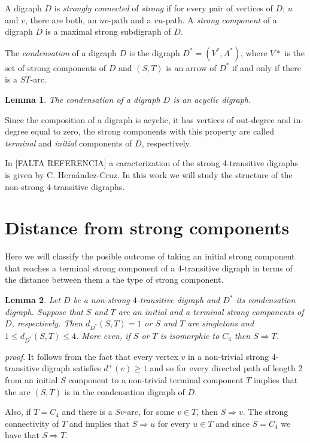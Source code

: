 \documentclass[a4paper,12pt]{article}
\newtheorem{lema}{Lemma}
\begin{document}
A digraph $D$ is \textit{strongly connected} of \textit{strong} if for every pair of vertices of $D$; $u$ and $v$, there are both, an $uv$-path and a $vu$-path. A \textit{strong component} of a digraph $D$ is a maximal strong subdigraph of $D$.

The \textit{condensation} of a digraph $D$ is the digraph $D^*=(V^*,A^*)$, where $V*$ is the set of strong components of $D$ and $(S,T)$ is an arrow of $D^*$ if and only if there is a $ST$-arc.

\begin{lema} The condensation of a digraph $D$ is an acyclic digraph.
\end{lema}

Since the composition of a digraph is acyclic, it has vertices of out-degree and in-degree equal to zero, the strong components with this property are called \textit{terminal} and \textit{initial} components of $D$, respectively.

In [FALTA REFERENCIA] a caracterization of the strong 4-transitive digraphs is given by C. Hern\'andez-Cruz. In this work we will study the structure of the non-strong 4-transitive digraphs.

\section{Distance from strong components}

Here we will classify the posible outcome of taking an initial strong component that reaches a terminal strong component of a 4-transitive digraph in terms of the distance between them a the type of strong component.

\begin{lema} Let $D$ be a non-strong $4$-transitive digraph and $D^*$ its condensation digraph. Suppose that $S$ and $T$ are an initial and a terminal strong components of $D$, respectively. Then $d_{D^*}(S,T)=1$ or $S$ and $T$ are singletons and $1\leq d_{D^*}(S,T)\leq 4$. More even, if $S$ or $T$ is isomorphic to $C_4$ then $S\Rightarrow T$.
\end{lema}

\textit{proof}. It follows from the fact that every vertex $v$ in a non-trivial strong 4-transitive digraph satisfies $d^+(v)\geq 1$ and so for every directed path of length 2 from an initial $S$ component to a non-trivial terminal component $T$ implies that the arc $(S,T)$ is in the condensation digraph of $D$.

Also, if $T=C_4$ and there is a $Sv$-arc, for some $v\in T$, then $S\Rightarrow v$. The strong connectivity of $T$ and implies that $S\Rightarrow u$ for every $u\in T$ and since $S=C_4$ we have that $S\Rightarrow T$. 
\end{document}
